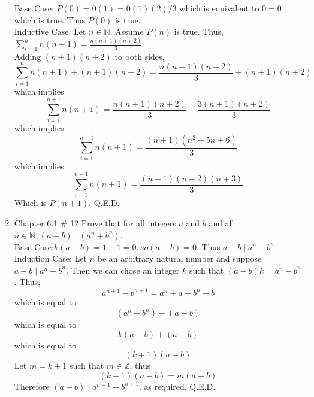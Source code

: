 \documentclass[10pt,a4paper]{article}
\begin{document}
\begin{enumerate}
Base Case: $P(0)= 0(1)=0(1)(2)/3 $ which is equivalent to $0=0$ which is true. Thus $P(0)$ is true.\\
Inductive Case: Let $n \in \mathbb{N}$. Assume $P(n)$ is true. Thus, $\sum\limits_{i=1}^n n(n+1)= \frac{n(n+1)(n+2)}{3} $\\
Adding $(n+1)(n+2)$ to both sides, 
$$\sum\limits_{i=1}^n n(n+1) + (n+1)(n+2)= \frac{n(n+1)(n+2)}{3} + (n+1)(n+2)  $$ which implies 
$$\sum\limits_{i=1}^{n+1} n(n+1)= \frac{n(n+1)(n+2)}{3} + \frac{3(n+1)(n+2)}{3}  $$ which implies 
$$\sum\limits_{i=1}^{n+1} n(n+1)= \frac{(n+1)(n^2+5n+6)}{3} $$ which implies 
$$\sum\limits_{i=1}^{n+1} n(n+1)= \frac{(n+1)(n+2)(n+3)}{3}  $$ 
Which is $P(n+1)$. Q.E.D.
\item  Chapter 6.1 \# 12 Prove that for all integers $a$ and $b$ and all $n \in \mathbb{N}, (a-b)\mid (a^n + b^n)$.\\
Base Case:$ k(a-b)= 1-1=0, so (a-b)=0.$ Thus $a-b\mid a^n- b^n$\\
Induction Case: Let $n$ be an arbitrary natural number and suppose $a-b\mid a^n-b^n$. Then we can chose an integer $k$ such that $(a-b)k=a^n - b^n$. Thus,
$$a^{n+1}-b^{n+1} = a^n +a - b^n -b$$
which is equal to
$$(a^n - b^n) +(a-b) $$
which is equal to
$$k(a-b)+(a-b) $$
which is equal to
$$(k+1)(a-b) $$
Let $m=k+1$ such that $m \in \mathbb{Z}$, thus
$$(k+1)(a-b)=m(a-b)$$
Therefore $(a-b)\mid a^{n+1}-b^{n+1} $, as required.
Q.E.D.
\end{enumerate}
\end{document}

